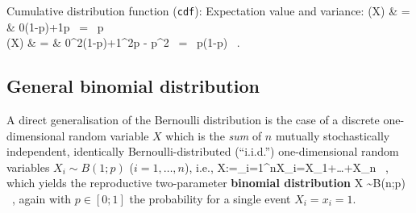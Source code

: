 \medskip
\noindent
Cumulative distribution function (\texttt{cdf}):
%
\be
{}
\ee
%
Expectation value and variance:
%
\bea
{}(X) & = & 0\times(1-p)+1\times p \ = \ p \\
(X) & = & 0^{2}\times(1-p)+1^{2}\times p - p^{2}
\ = \ p(1-p) \ .
\eea
%

\subsection[General binomial distribution]{General binomial
distribution}
A direct generalisation of the Bernoulli distribution is the 
case of a discrete one-dimensional random variable $X$ which is 
the \textit{sum} of $n$ mutually stochastically independent, 
identically Bernoulli-distributed (``i.i.d.'') one-dimensional 
random variables $X_{i}\sim B(1;p)$ ($i=1,\ldots,n$), i.e.,
%
\be
X:=\sum_{i=1}^{n}X_{i}=X_{1}+\ldots +X_{n} \ ,
\ee
%
which yields the reproductive two-parameter \textbf{binomial 
distribution}
%
\be
X \sim B(n;p) \ ,
\ee
%
again with $p \in [0;1]$ the probability for a single event 
$X_{i} = x_{i} = 1$.

